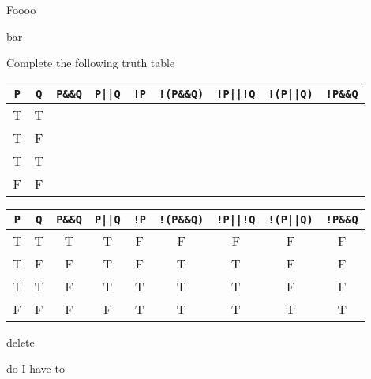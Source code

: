 \documentclass[10pt,addpoints]{exam}
\begin{document}
\begin{questions}
\par\vspace{0.100000in}\begin{minipage}{\linewidth}
\question[10]

Foooo

\begin{solutionbox}{3in}

bar
\end{solutionbox}
\end{minipage}


\par\vspace{0.100000in}\begin{minipage}{\linewidth}
\question[14]

Complete the following truth table
\begin{center}
\begin{tabular}{ | c | c | c | c | c | c | c | c | c |}
\hline

\verb#P#&\verb#Q#&\verb#P&&Q#&\verb#P||Q#&\verb#!P#&
\verb#!(P&&Q)#&\verb#!P||!Q#&\verb#!(P||Q)#&\verb#!P&&Q# \\ \hline
T&T& & & & & & &  \\ \hline
T&F& & & & & & &  \\ \hline
T&T& & & & & & &  \\ \hline
F&F& & & & & & &  \\ \hline
\end{tabular}
\end{center}

\begin{solutionbox}{0in}

\begin{center}
\begin{tabular}{ | c | c | c | c | c | c | c | c | c |}
\hline
\verb#P#&\verb#Q#&\verb#P&&Q#&\verb#P||Q#&\verb#!P#&
\verb#!(P&&Q)#&\verb#!P||!Q#&\verb#!(P||Q)#&\verb#!P&&Q# \\ \hline
T&T&T&T&F&F&F&F&F \\ \hline
T&F&F&T&F&T&T&F&F \\ \hline
T&T&F&T&T&T&T&F&F \\ \hline
F&F&F&F&T&T&T&T&T \\ \hline
\end{tabular}
\end{center}

\end{solutionbox}
\end{minipage}


\par\vspace{0.100000in}\begin{minipage}{\linewidth}
\question[20]
delete
\begin{solutionbox}{3in}
do I have to
\end{solutionbox}
\end{minipage}



\end{questions}
\end{document}
